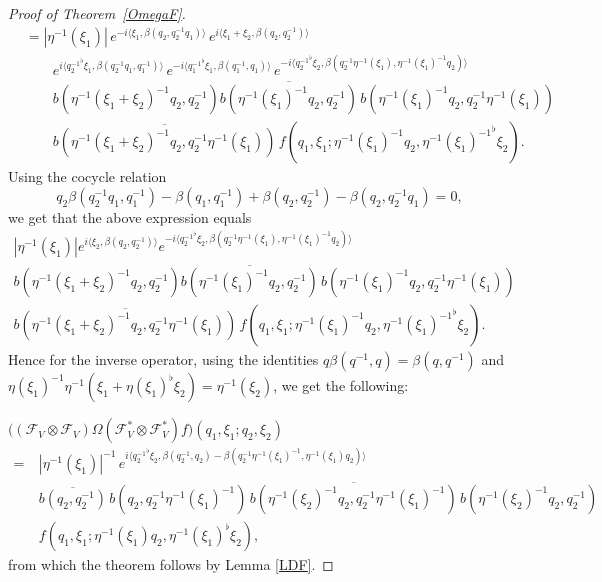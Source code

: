 \documentclass[a4paper,11pt,reqno]{amsart}
\numberwithin{equation}{section}
\theoremstyle{remark}
\theoremstyle{definition}
\newcommand{\CF}{\mathcal F}
\begin{document}
\begin{proof}[Proof of Theorem~\ref{OmegaF}]
\begin{align*}
&=|\eta^{-1}(\xi_1)|\, e^{-i\langle\xi_1,\beta(q_2,q_2^{-1}q_1)\rangle}\,
 e^{i\langle \xi_1+\xi_2,\beta(q_2,q_2^{-1})\rangle}\\
&\qquad e^{i\langle{q_2^{-1}}^\flat\xi_1,\beta(q_2^{-1}q_1,q_1^{-1})\rangle}
\, e^{-i\langle {q_1^{-1}}^\flat\xi_1,\beta(q_1^{-1},q_1)\rangle}\,e^{-i\langle {q_2^{-1}}^\flat\xi_2,\beta(q_2^{-1}\eta^{-1}(\xi_1),\eta^{-1}(\xi_1)^{-1}q_2)\rangle}
 \\
&\qquad b (\eta^{-1}(\xi_1+\xi_2)^{-1}q_2,q_2^{-1})
 \overline{b(\eta^{-1}(\xi_1)^{-1}q_2,q_2^{-1})}\,
b (\eta^{-1}(\xi_1)^{-1}q_2,q_2^{-1}\eta^{-1}( \xi_1))
\\
&\qquad \overline{b (\eta^{-1}(\xi_1+\xi_2)^{-1}q_2,q_2^{-1}\eta^{-1}(\xi_1))}\,
f(q_1,\xi_1;\eta^{-1}(\xi_1)^{-1}q_2,{\eta^{-1}(\xi_1)^{-1}}^\flat\xi_2).
\end{align*}
Using the cocycle relation
$$
q_2\beta(q_2^{-1}q_1,q_1^{-1})-\beta(q_1,q_1^{-1})+\beta(q_2,q_2^{-1})-\beta(q_2,q_2^{-1}q_1)=0,
$$
we get that the above expression equals
\begin{multline*}
|\eta^{-1}(\xi_1)|
  e^{i\langle \xi_2,\beta(q_2,q_2^{-1})\rangle}e^{-i\langle {q_2^{-1}}^\flat\xi_2,\beta(q_2^{-1}\eta^{-1}(\xi_1),\eta^{-1}(\xi_1)^{-1}q_2)\rangle}
 \\
b (\eta^{-1}(\xi_1+\xi_2)^{-1}q_2,q_2^{-1})
 \overline{b(\eta^{-1}(\xi_1)^{-1}q_2,q_2^{-1})}\,
b (\eta^{-1}(\xi_1)^{-1}q_2,q_2^{-1}\eta^{-1}( \xi_1))
\\
\overline{b (\eta^{-1}(\xi_1+\xi_2)^{-1}q_2,q_2^{-1}\eta^{-1}(\xi_1))}\,
f(q_1,\xi_1;\eta^{-1}(\xi_1)^{-1}q_2,{\eta^{-1}(\xi_1)^{-1}}^\flat\xi_2).
\end{multline*}
Hence for the inverse operator, using the  identities  $q\beta(q^{-1},q)=\beta(q,q^{-1})$ and $\eta(\xi_1)^{-1}\eta^{-1}(\xi_1+
 \eta(\xi_1)^\flat\xi_2)=\eta^{-1}(\xi_2)$, we get the following:

\medskip
$\displaystyle \big((\CF_V\otimes\CF_V)\Omega (\CF_V^*\otimes\CF_V^*)f\big)(q_1,\xi_1;q_2,\xi_2)$
\begin{align*}
=\ &|\eta^{-1}(\xi_1)|^{-1}\,e^{i\langle {q_2^{-1}}^\flat\xi_2,\beta(q_2^{-1},q_2)-\beta(q_2^{-1}\eta^{-1}(\xi_1)^{-1},\eta^{-1}(\xi_1)q_2)\rangle}\\
&  \overline{b (q_2,q_2^{-1})}\,b (q_2,q_2^{-1}\eta^{-1}(\xi_1)^{-1})\,\overline{b(\eta^{-1}(\xi_2)^{-1}q_2,q_2^{-1}\eta^{-1}(\xi_1)^{-1})}\,b (\eta^{-1}(\xi_2)^{-1}q_2,q_2^{-1})\\
& f(q_1, \xi_1 ;\eta^{-1}(\xi_1)q_2,\eta^{-1}(\xi_1)^\flat\xi_2),
\end{align*}
from which the theorem follows by Lemma \ref{LDF}.
\end{proof}
\end{document}
